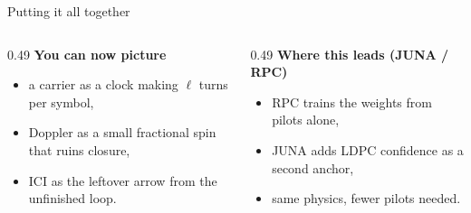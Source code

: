 \documentclass[aspectratio=169,10pt]{beamer}
\begin{document}
\begin{frame}{Putting it all together}
\vspace{0.08cm}
{\scriptsize
\begin{columns}[T,onlytextwidth]
  \begin{column}{0.49\textwidth}
    \textbf{You can now picture}
    \begin{itemize}\setlength{\itemsep}{-0.10em}
      \item a carrier as a clock making $\ell$ turns per symbol,
      \item Doppler as a small fractional spin that ruins closure,
      \item ICI as the leftover arrow from the unfinished loop.
    \end{itemize}
  \end{column}
  \begin{column}{0.49\textwidth}
    \textbf{Where this leads (JUNA / RPC)}
    \begin{itemize}\setlength{\itemsep}{-0.10em}
      \item RPC trains the weights from pilots alone,
      \item JUNA adds LDPC confidence as a second anchor,
      \item same physics, fewer pilots needed.
    \end{itemize}
  \end{column}
\end{columns}}

\end{frame}
\end{document}
